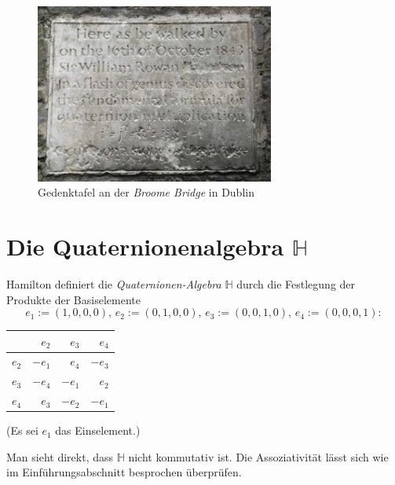 \documentclass[aspectratio=169]{beamer}
\newcommand{\Ham}{\ensuremath{\mathbb{H}}{ }}
\begin{document}
    \begin{frame}
        \begin{figure}
            \includegraphics[width=0.7\textwidth]{broome_bridge.jpg}
            \caption{Gedenktafel an der \textit{Broome Bridge} in Dublin \cite{broome_bridge}}
        \end{figure}
    \end{frame}

    \section{Die Quaternionenalgebra \(\mathbb{H}\)}

    \begin{frame}
        Hamilton definiert die \emph{Quaternionen-Algebra} \(\Ham\) durch die Festlegung der Produkte der Basiselemente
        \[
            e_1 := (1,0,0,0), \, e_2 := (0,1,0,0), \, e_3 := (0,0,1,0), \, e_4 := (0,0,0,1):
        \] 
        \centering
        \begin{tabular}{crrr}
                    & \(e_2\) & \(e_3\) & \(e_4\) \\ \midrule
            \(e_2\) & \(- e_1\) & \(e_4\) & \(- e_3\) \\
            \(e_3\) & \(- e_4\) & \(- e_1\) & \(e_2\) \\
            \(e_4\) & \(e_3\) & \(- e_2\) & \(-e _1\)
        \end{tabular}

        \small (Es sei \(e_1\) das Einselement.)

        \raggedright
        \normalsize
        Man sieht direkt, dass \(\Ham\) nicht kommutativ ist.
        Die Assoziativität lässt sich wie im Einführungsabschnitt besprochen überprüfen.
    \end{frame}
\end{document}
